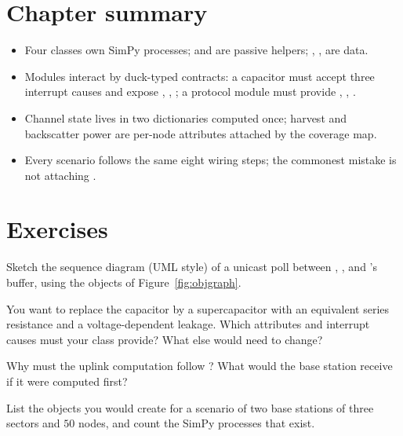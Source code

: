 \section{Chapter summary}
\begin{itemize}
 \item Four classes own SimPy processes;  and  are passive helpers; , ,  are data.
 \item Modules interact by duck-typed contracts: a capacitor must accept three interrupt causes and expose , , ; a protocol module must provide , , .
 \item Channel state lives in two dictionaries computed once; harvest and backscatter power are per-node attributes attached by the coverage map.
 \item Every scenario follows the same eight wiring steps; the commonest mistake is not attaching .
\end{itemize}

\section*{Exercises}
\begin{exercise}
Sketch the sequence diagram (UML style) of a unicast poll between , ,  and 's buffer, using the objects of Figure~\ref{fig:objgraph}.
\end{exercise}
\begin{exercise}
You want to replace the capacitor by a supercapacitor with an equivalent series resistance and a voltage-dependent leakage. Which attributes and interrupt causes must your class provide? What else would need to change?
\end{exercise}
\begin{exercise}
Why must the uplink computation follow ? What would the base station receive if it were computed first?
\end{exercise}
\begin{exercise}
List the objects you would create for a scenario of two base stations of three sectors and $50$ nodes, and count the SimPy processes that exist.
\end{exercise}

